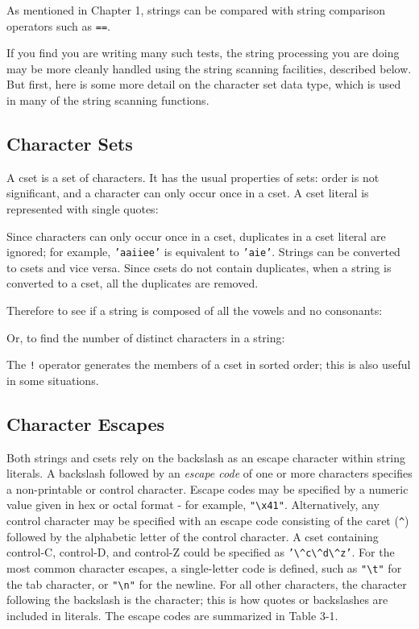 As mentioned in Chapter 1, strings can be compared with string
comparison operators such as
\texttt{==}.


If you find you are writing many such tests, the string processing you
are doing may be more cleanly handled using the string scanning
facilities, described below. But first, here is some more detail on the
character set data type, which is used in many of the string scanning
functions.

\subsection{Character Sets}

A cset is a set of characters. It has the usual properties of sets:
order is not significant, and a character can only occur once in a
cset. A cset literal is represented with single
quotes:


Since characters can only occur once in a cset, duplicates in a cset
literal are ignored; for example,
\texttt{'aaiiee'} is equivalent to
\texttt{'aie'}. Strings can be
converted to csets and vice versa. Since csets do not contain
duplicates, when a string is converted to a cset, all the duplicates
are removed.

Therefore to see if a string is composed of all the vowels and no
consonants:


Or, to find the number of distinct characters in a string:


The \texttt{!} operator generates the members of a cset in sorted order;
this is also useful in some situations.

\subsection{Character Escapes}

Both strings and csets rely on the backslash as an escape character
within string literals. A backslash followed by an \textit{escape code} of one or more characters specifies a
non-printable or control character. Escape codes may be specified by a
numeric value given in hex or octal format - for example,
\texttt{"{\textbackslash}x41"}.
Alternatively, any control character may be specified with an escape
code consisting of the caret (\texttt{\^{}}) followed by the alphabetic
letter of the control character. A cset containing control-C,
control-D, and control-Z could be specified as
\texttt{'{\textbackslash}\^{}c{\textbackslash}\^{}d{\textbackslash}\^{}z'}.
For the most common character escapes, a single-letter code is defined,
such as \texttt{"{\textbackslash}t"} for
the tab character, or
\texttt{"{\textbackslash}n"} for the
newline. For all other characters, the character following the
backslash is the character; this is how quotes or backslashes are
included in literals. The escape codes are summarized in Table 3-1.


